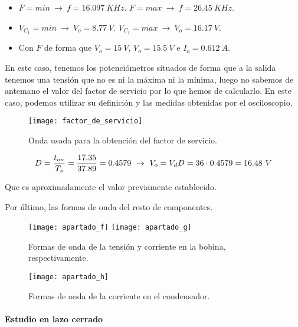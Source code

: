\documentclass[10pt]{article}
\begin{document}
	\begin{itemize}
		\item $F=min\ \rightarrow\ f=16.097\ KHz$. $F=max\ \rightarrow\ f=26.45\ KHz$.
		\item $V_{C_1}=min\ \rightarrow\ V_o=8.77\ V$. $V_{C_1}=max\ \rightarrow\ V_o=16.17\ V$.
		\item Con $F$ de forma que $V_o=15\ V$, $V_o=15.5\ V$ e $I_o=0.612\ A$.
	\end{itemize}

	En este caso, tenemos los potenciómetros situados de forma que a la salida tenemos una tensión que no es ni la máxima ni la mínima, luego no sabemos de antemano el valor del factor de servicio por lo que hemos de calcularlo. En este caso, podemos utilizar su definición y las medidas obtenidas por el osciloscopio.
	
	\begin{figure}[H]
		\begin{center}
			\texttt{[image: factor\_de\_servicio]}
		\end{center}\caption{Onda usada para la obtención del factor de servicio.}
	\end{figure}

	$$D = \frac{t_{on}}{T_s}= \frac{17.35}{37.89}=0.4579\ \rightarrow\ V_o=V_dD=36\cdot 0.4579=16.48\ V\medskip$$
	
	Que es aproximadamente el valor previamente establecido. 
	
	Por último, las formas de onda del resto de componentes.
	
	\begin{figure}[H]
		\begin{center}
			\texttt{[image: apartado\_f]}
			\texttt{[image: apartado\_g]}
		\end{center}\caption{Formas de onda de la tensión y corriente en la bobina, respectivamente.}
	\end{figure}

	\begin{figure}[H]
		\begin{center}
			\texttt{[image: apartado\_h]}
		\end{center}\caption{Formas de onda de la corriente en el condensador.}
	\end{figure}
	
	\paragraph{Estudio en lazo cerrado}\medskip
	
\end{document}
